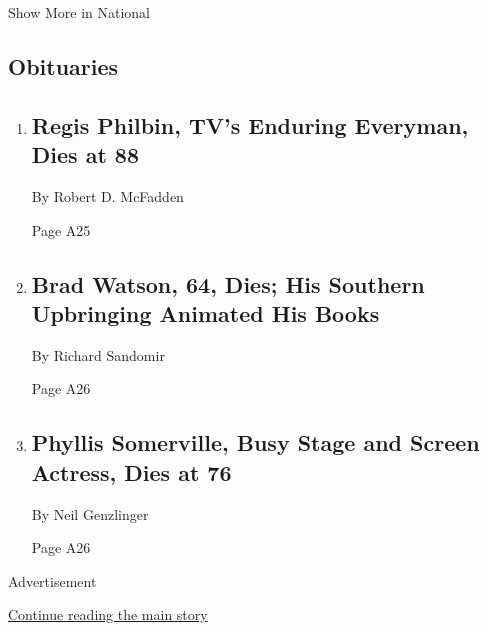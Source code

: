 Show More in National

\hypertarget{obituaries}{%
\subsection{Obituaries}\label{obituaries}}

\begin{enumerate}
\def\labelenumi{\arabic{enumi}.}
\item
  \href{/2020/07/25/arts/television/regis-philbin-dead.html}{}

  \hypertarget{regis-philbin-tvs-enduring-everyman-dies-at-88-1}{%
  \subsection{Regis Philbin, TV's Enduring Everyman, Dies at
  88}\label{regis-philbin-tvs-enduring-everyman-dies-at-88-1}}

  By Robert D. McFadden

  Page A25
\item
  \href{/2020/07/24/books/brad-watson-dead.html}{}

  \hypertarget{brad-watson-64-dies-his-southern-upbringing-animated-his-books}{%
  \subsection{Brad Watson, 64, Dies; His Southern Upbringing Animated
  His
  Books}\label{brad-watson-64-dies-his-southern-upbringing-animated-his-books}}

  By Richard Sandomir

  Page A26
\item
  \href{/2020/07/22/arts/television/phyllis-somerville-dead.html}{}

  \hypertarget{phyllis-somerville-busy-stage-and-screen-actress-dies-at-76}{%
  \subsection{Phyllis Somerville, Busy Stage and Screen Actress, Dies at
  76}\label{phyllis-somerville-busy-stage-and-screen-actress-dies-at-76}}

  By Neil Genzlinger

  Page A26
\end{enumerate}

Advertisement

\protect\hyperlink{after-mid3}{Continue reading the main story}

